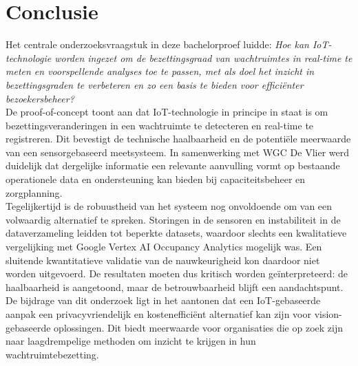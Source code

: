 
\chapter{Conclusie}%
\label{ch:conclusie}


Het centrale onderzoeksvraagstuk in deze bachelorproef luidde: 
\textit{Hoe kan IoT-technologie worden ingezet om de bezettingsgraad van wachtruimtes in real-time te meten en voorspellende analyses toe te passen, met als doel het inzicht in bezettingsgraden te verbeteren en zo een basis te bieden voor efficiënter bezoekersbeheer?} \\

De proof-of-concept toont aan dat IoT-technologie in principe in staat is om bezettingsveranderingen in een wachtruimte te detecteren en real-time te registreren. Dit bevestigt de technische haalbaarheid en de potentiële meerwaarde van een sensorgebaseerd meetsysteem. In samenwerking met WGC De Vlier werd duidelijk dat dergelijke informatie een relevante aanvulling vormt op bestaande operationele data en ondersteuning kan bieden bij capaciteitsbeheer en zorgplanning. \\

Tegelijkertijd is de robuustheid van het systeem nog onvoldoende om van een volwaardig alternatief te spreken. Storingen in de sensoren en instabiliteit in de dataverzameling leidden tot beperkte datasets, waardoor slechts een kwalitatieve vergelijking met Google Vertex AI Occupancy Analytics mogelijk was. Een sluitende kwantitatieve validatie van de nauwkeurigheid kon daardoor niet worden uitgevoerd. De resultaten moeten dus kritisch worden geïnterpreteerd: de haalbaarheid is aangetoond, maar de betrouwbaarheid blijft een aandachtspunt. \\

De bijdrage van dit onderzoek ligt in het aantonen dat een IoT-gebaseerde aanpak een privacyvriendelijk en kostenefficiënt alternatief kan zijn voor vision-gebaseerde oplossingen. Dit biedt meerwaarde voor organisaties die op zoek zijn naar laagdrempelige methoden om inzicht te krijgen in hun wachtruimtebezetting. \\

